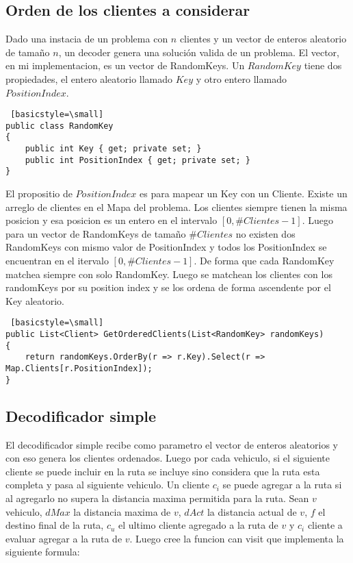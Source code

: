 \subsection{Orden de los clientes a considerar}

Dado una instacia de un problema con $n$ clientes y un vector de enteros aleatorio de tamaño $n$, un decoder genera una solución valida de un problema. El vector, en mi implementacion, es un vector de RandomKeys. Un $RandomKey$ tiene dos propiedades, el entero aleatorio llamado $Key$ y otro entero llamado $PositionIndex$. 

\bigskip

\begin{lstlisting} [basicstyle=\small]
public class RandomKey
{        
	public int Key { get; private set; }
	public int PositionIndex { get; private set; }
}
\end{lstlisting}

\bigskip

El propositio de $PositionIndex$ es para mapear un Key con un Cliente. Existe un arreglo de clientes en el Mapa del problema. Los clientes siempre tienen la misma posicion y esa posicion es un entero en el intervalo $[0, \#Clientes-1]$. Luego para un vector de RandomKeys de tamaño $\#Clientes$ no existen dos RandomKeys con mismo valor de PositionIndex y todos los PositionIndex se encuentran en el itervalo $[0, \#Clientes-1]$. De forma que cada RandomKey matchea siempre con solo RandomKey. Luego se matchean los clientes con los randomKeys por su position index y se los ordena de forma ascendente por el Key aleatorio.

\bigskip

\begin{lstlisting} [basicstyle=\small]
public List<Client> GetOrderedClients(List<RandomKey> randomKeys)
{        
	return randomKeys.OrderBy(r => r.Key).Select(r => Map.Clients[r.PositionIndex]);
}
\end{lstlisting}

\subsection{Decodificador simple}

El decodificador simple recibe como parametro el vector de enteros aleatorios y con eso genera los clientes ordenados. Luego por cada vehiculo, si el siguiente cliente se puede incluir en la ruta se incluye sino considera que la ruta esta completa y pasa al siguiente vehiculo. Un cliente $c_i$ se puede agregar a la ruta si al agregarlo no supera la distancia maxima permitida para la ruta. Sean $v$ vehiculo, $dMax$ la distancia maxima de $v$, $dAct$ la distancia actual de $v$, $f$ el destino final de la ruta, $c_u$ el ultimo cliente agregado a la ruta de $v$ y $c_i$ cliente a evaluar agregar a la ruta de $v$. Luego cree la funcion can visit que implementa la siguiente formula:

